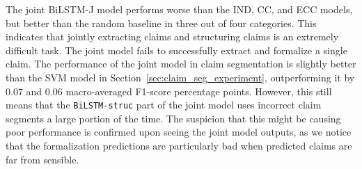 
The joint BiLSTM-J model performs worse than the IND, CC, and ECC
models, but better than the random baseline in three out of four categories.
This indicates that jointly extracting claims and structuring claims is an
extremely difficult task. The joint model fails to successfully extract and
formalize a single claim. 
The performance of the joint model in claim segmentation is slightly better than the 
SVM model in Section~\ref{sec:claim_seg_experiment}, outperforming it by 
$0.07$ and $0.06$ macro-averaged F1-score percentage points. However, this still means
that the \texttt{BiLSTM-struc} part of the joint model uses incorrect claim segments
a large portion of the time. 
The suspicion that this might be causing poor performance is confirmed upon
seeing the joint model outputs, as we notice that the formalization predictions
are particularly bad when predicted claims are far from sensible. 

